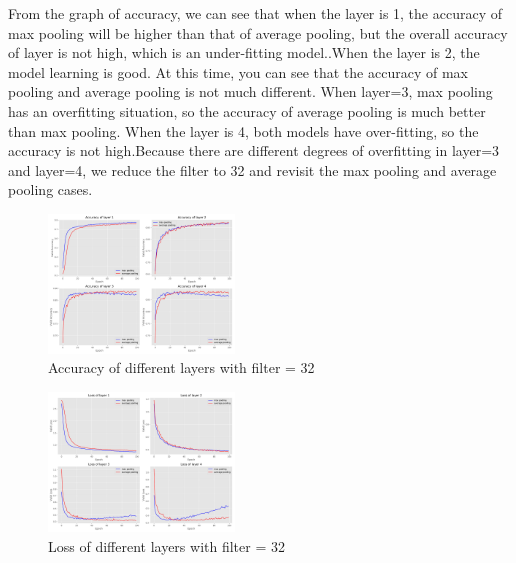 \documentclass{article}
\begin{document}
From the graph of accuracy, we can see that when the layer is 1, the accuracy of max pooling will be higher than that of average pooling, but the overall accuracy of layer is not high, which is an under-fitting model..When the layer is 2, the model learning is good. At this time, you can see that the accuracy of max pooling and average pooling is not much different. When layer=3, max pooling has an overfitting situation, so the accuracy of average pooling is much better than max pooling. When the layer is 4, both models have over-fitting, so the accuracy is not high.Because there are different degrees of overfitting in layer=3 and layer=4, we reduce the filter to 32 and revisit the max pooling and average pooling cases.


\begin{figure}[H] %
	\centering %
	\includegraphics[width=0.44\textwidth]{./pic/part2/filter32_max_average_layer_acc.pdf} %
	\caption{Accuracy of different layers with filter = 32} %
	\label{Fig.main2} %
\end{figure}

\begin{figure}[H] %
	\centering %
	\includegraphics[width=0.44\textwidth]{./pic/part2/filter32_max_average_layer_loss.pdf} %
	\caption{Loss of different layers with filter = 32} %
	\label{Fig.main2} %
\end{figure}
\end{document}
